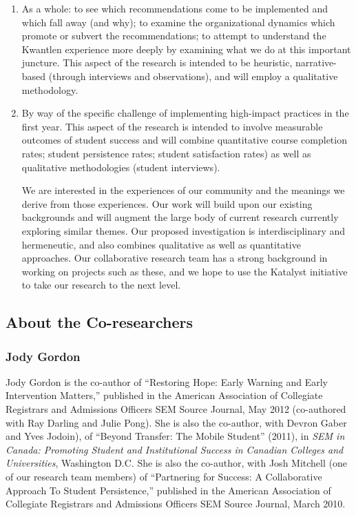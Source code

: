 \documentclass[letterpaper,10pt,headsepline]{scrreprt}
\begin{document}
\begin{enumerate}
\item As a whole: to see which recommendations come to be implemented and
  which fall away (and why); to examine the organizational dynamics which
  promote or subvert the recommendations; to attempt to understand the
  Kwantlen experience more deeply by examining what we do at this important
  juncture. This aspect of the research is intended to be heuristic,
  narrative-based (through interviews and observations), and will employ a
  qualitative methodology.

\item By way of the specific challenge of implementing high-impact practices
  in the first year. This aspect of the research is intended to involve
  measurable outcomes of student success and will combine quantitative course
  completion rates; student persistence rates; student satisfaction rates) as
  well as qualitative methodologies (student interviews).

  We are interested in the experiences of our community and the meanings we
  derive from those experiences. Our work will build upon our existing
  backgrounds and will augment the large body of current research currently
  exploring similar themes. Our proposed investigation is interdisciplinary
  and hermeneutic, and also combines qualitative as well as quantitative
  approaches. Our collaborative research team has a strong background in
  working on projects such as these, and we hope to use the Katalyst
  initiative to take our research to the next level.

\end{enumerate}

\subsection{About the Co-researchers}

  \subsubsection{Jody Gordon}

  Jody Gordon is the co-author of ``Restoring Hope: Early Warning and Early
  Intervention Matters,'' published in the American Association of Collegiate
  Registrars and Admissions Officers SEM Source Journal, May 2012 (co-authored
  with Ray Darling and Julie Pong). She is also the co-author, with Devron
  Gaber and Yves Jodoin), of ``Beyond Transfer: The Mobile Student'' (2011),
  in \emph{SEM in Canada: Promoting Student and Institutional Success in
    Canadian Colleges and Universities}, Washington D.C. She is also the
  co-author, with Josh Mitchell (one of our research team members) of
  ``Partnering for Success: A Collaborative Approach To Student Persistence,''
  published in the American Association of Collegiate Registrars and
  Admissions Officers SEM Source Journal, March 2010.
\end{document}
